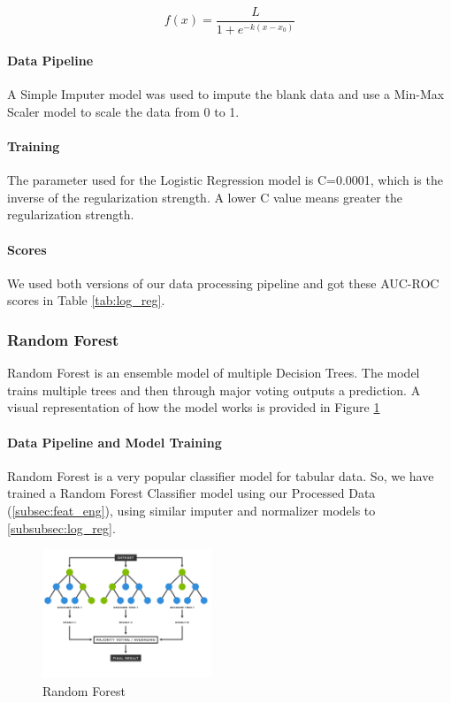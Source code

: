 \documentclass[sigconf, nonacm]{acmart}
\begin{document}
\begin{equation}
	f(x) = \frac{L}{1 + e^{-k(x-x_0)}}
	\label{eqn:log_func}
\end{equation}

\paragraph{Data Pipeline}
A Simple Imputer\cite{sklearn.impute.simpleimputer} model was used to impute the blank data and use a Min-Max Scaler model\cite{sklearn.preprocessing.minmaxscaler} to scale the data from 0 to 1.

\paragraph{Training}
The parameter used for the Logistic Regression model is C=0.0001, which is the inverse of the regularization strength. A lower C value means greater the regularization strength.

\paragraph{Scores}
We used both versions of our data processing pipeline and got these AUC-ROC scores in Table \ref{tab:log_reg}.

\subsubsection{Random Forest}

Random Forest\cite{sklearn.ensemble.randomforestclassifier} is an ensemble model of multiple Decision Trees. The model trains multiple trees and then through major voting outputs a prediction. A visual representation of how the model works is provided in Figure \ref{fig:ran_for}

\paragraph{Data Pipeline and Model Training}
Random Forest is a very popular classifier model for tabular data. So, we have trained a Random Forest Classifier model using our Processed Data (\ref{subsec:feat_eng}), using similar imputer and normalizer models to \ref{subsubsec:log_reg}.
\begin{figure}[t]
    \centering
    \includegraphics[width=0.45\textwidth]{random_forest/random-forest-diagram.png}
    \caption{Random Forest}
    \label{fig:ran_for}
\end{figure}
\end{document}
